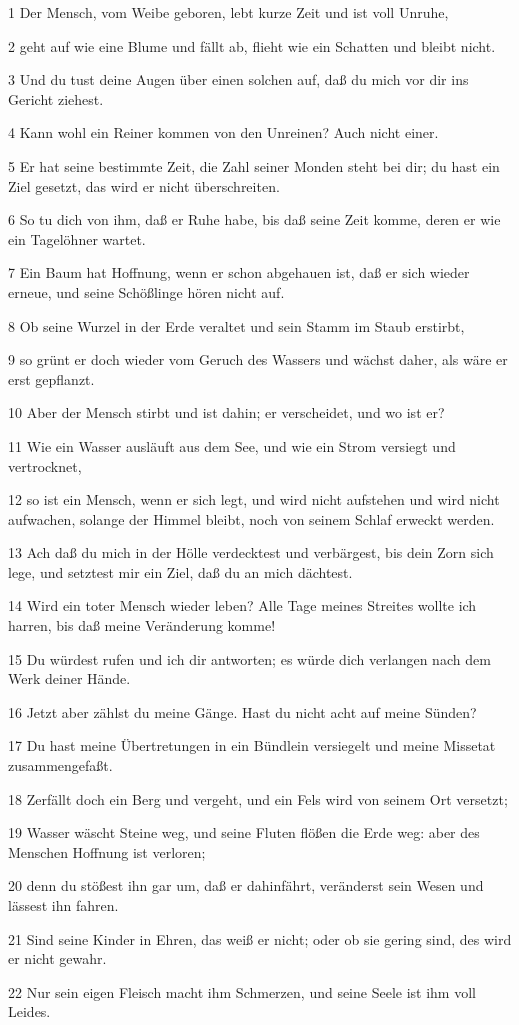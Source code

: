 \par 1 Der Mensch, vom Weibe geboren, lebt kurze Zeit und ist voll Unruhe,
\par 2 geht auf wie eine Blume und fällt ab, flieht wie ein Schatten und bleibt nicht.
\par 3 Und du tust deine Augen über einen solchen auf, daß du mich vor dir ins Gericht ziehest.
\par 4 Kann wohl ein Reiner kommen von den Unreinen? Auch nicht einer.
\par 5 Er hat seine bestimmte Zeit, die Zahl seiner Monden steht bei dir; du hast ein Ziel gesetzt, das wird er nicht überschreiten.
\par 6 So tu dich von ihm, daß er Ruhe habe, bis daß seine Zeit komme, deren er wie ein Tagelöhner wartet.
\par 7 Ein Baum hat Hoffnung, wenn er schon abgehauen ist, daß er sich wieder erneue, und seine Schößlinge hören nicht auf.
\par 8 Ob seine Wurzel in der Erde veraltet und sein Stamm im Staub erstirbt,
\par 9 so grünt er doch wieder vom Geruch des Wassers und wächst daher, als wäre er erst gepflanzt.
\par 10 Aber der Mensch stirbt und ist dahin; er verscheidet, und wo ist er?
\par 11 Wie ein Wasser ausläuft aus dem See, und wie ein Strom versiegt und vertrocknet,
\par 12 so ist ein Mensch, wenn er sich legt, und wird nicht aufstehen und wird nicht aufwachen, solange der Himmel bleibt, noch von seinem Schlaf erweckt werden.
\par 13 Ach daß du mich in der Hölle verdecktest und verbärgest, bis dein Zorn sich lege, und setztest mir ein Ziel, daß du an mich dächtest.
\par 14 Wird ein toter Mensch wieder leben? Alle Tage meines Streites wollte ich harren, bis daß meine Veränderung komme!
\par 15 Du würdest rufen und ich dir antworten; es würde dich verlangen nach dem Werk deiner Hände.
\par 16 Jetzt aber zählst du meine Gänge. Hast du nicht acht auf meine Sünden?
\par 17 Du hast meine Übertretungen in ein Bündlein versiegelt und meine Missetat zusammengefaßt.
\par 18 Zerfällt doch ein Berg und vergeht, und ein Fels wird von seinem Ort versetzt;
\par 19 Wasser wäscht Steine weg, und seine Fluten flößen die Erde weg: aber des Menschen Hoffnung ist verloren;
\par 20 denn du stößest ihn gar um, daß er dahinfährt, veränderst sein Wesen und lässest ihn fahren.
\par 21 Sind seine Kinder in Ehren, das weiß er nicht; oder ob sie gering sind, des wird er nicht gewahr.
\par 22 Nur sein eigen Fleisch macht ihm Schmerzen, und seine Seele ist ihm voll Leides.


